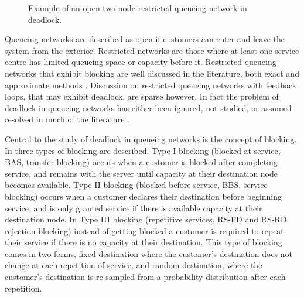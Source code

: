 \documentclass{article}
\numberwithin{equation}{section}
\begin{document}
\begin{figure}[!htbp]
  \begin{center}
  
  \end{center}
  \caption{Example of an open two node restricted queueing network in deadlock.}
  \label{fig:1st_example}
\end{figure}

Queueing networks are described as open if customers can enter and leave the system from the exterior.
Restricted networks are those where at least one service centre has limited queueing space or capacity before it.
Restricted queueing networks that exhibit blocking are well discussed in the literature, both exact \cite{hunt56, baber08, aviitzhakyadin65, koizumietal05, latoucheneuts80, perrosetal88, gordonnewell67} and approximate methods \cite{takahashi80, korporaaletal00, onvural90, perrosetal88, dalleryfrein93, allonetal13}. Discussion on restricted queueing networks with feedback loops, that may exhibit deadlock, are sparse however.
In fact the problem of deadlock in queueing networks has either been ignored, not studied, or assumed resolved in much of the literature \cite{onvural90, perrosetal88}.

Central to the study of deadlock in queueing networks is the concept of blocking.
In \cite{onvuralperros86} three types of blocking are described.
Type I blocking (blocked at service, BAS, transfer blocking) occurs when a customer is blocked after completing service, and remains with the server until capacity at their destination node becomes available.
Type II blocking (blocked before service, BBS, service blocking) occurs when a customer declares their destination before beginning service, and is only granted service if there is available capacity at their destination node.
In Type III blocking (repetitive services, RS-FD and RS-RD, rejection blocking) instead of getting blocked a customer is required to repeat their service if there is no capacity at their destination. This type of blocking comes in two forms, fixed destination where the customer's destination does not change at each repetition of service, and random destination, where the customer's destination is re-sampled from a probability distribution after each repetition.
\end{document}
